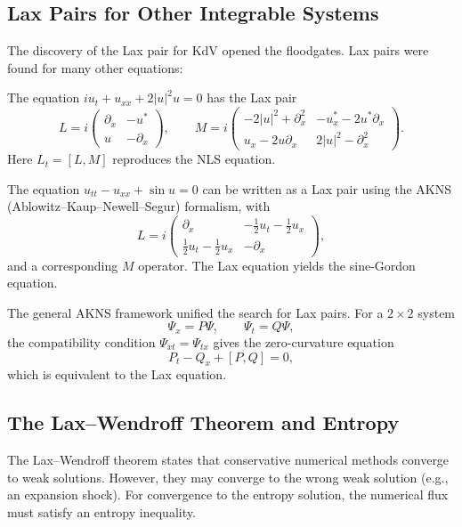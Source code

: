 \subsection{Lax Pairs for Other Integrable Systems}

The discovery of the Lax pair for KdV opened the floodgates. Lax pairs were found for many other equations:

\begin{example}
The equation \(i u_t + u_{xx} + 2|u|^2 u = 0\) has the Lax pair
\[
L = i\begin{pmatrix}
\partial_x & -u^* \\
u & -\partial_x
\end{pmatrix},
\qquad
M = i\begin{pmatrix}
-2|u|^2 + \partial_x^2 & -u_x^* - 2u^* \partial_x \\
u_x - 2u \partial_x & 2|u|^2 - \partial_x^2
\end{pmatrix}.
\]
Here \(L_t = [L, M]\) reproduces the NLS equation.
\end{example}

\begin{example}
The equation \(u_{tt} - u_{xx} + \sin u = 0\) can be written as a Lax pair using the AKNS (Ablowitz--Kaup--Newell--Segur) formalism, with
\[
L = i\begin{pmatrix}
\partial_x & -\frac12 u_t - \frac12 u_x \\
\frac12 u_t - \frac12 u_x & -\partial_x
\end{pmatrix},
\]
and a corresponding \(M\) operator. The Lax equation yields the sine-Gordon equation.
\end{example}

The general AKNS framework unified the search for Lax pairs. For a \(2 \times 2\) system
\[
\Psi_x = P \Psi, \qquad \Psi_t = Q \Psi,
\]
the compatibility condition \(\Psi_{xt} = \Psi_{tx}\) gives the zero-curvature equation
\[
P_t - Q_x + [P, Q] = 0,
\]
which is equivalent to the Lax equation.

\subsection{The Lax--Wendroff Theorem and Entropy}

The Lax--Wendroff theorem states that conservative numerical methods converge to weak solutions. However, they may converge to the wrong weak solution (e.g., an expansion shock). For convergence to the entropy solution, the numerical flux must satisfy an entropy inequality.

